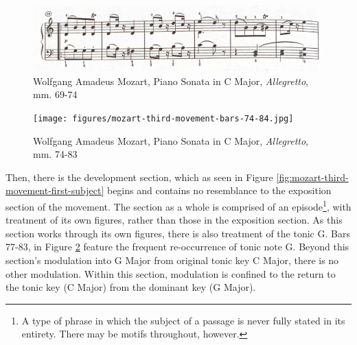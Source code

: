 \begin{figure}[h]
	\centering
	\includegraphics[width=\textwidth]{figures/mozart-third-movement-development-section-first-six-bars.jpg}
	\caption{Wolfgang Amadeus Mozart, Piano Sonata in C Major, \textit{Allegretto}, mm. 69-74}
	\label{fig:mozart-third-movement-development-section-first-six-bars}
\end{figure}

\begin{figure}
	\centering
	\texttt{[image: figures/mozart-third-movement-bars-74-84.jpg]}
	\caption{Wolfgang Amadeus Mozart, Piano Sonata in C Major, \textit{Allegretto}, mm. 74-83}
	\label{fig:mozart-third-movement-bars-74-84}
\end{figure}

Then, there is the development section, which as seen in Figure \ref{fig:mozart-third-movement-first-subject}\autocite{Henle_1977} begins and contains no resemblance to the exposition section of the movement. The section as a whole is comprised of an episode\footnote{A type of phrase in which the subject of a passage is never fully stated in its entirety. There may be motifs throughout, however.}, with treatment of its own figures, rather than those in the exposition section. As this section works through its own figures, there is also treatment of the tonic G. Bars 77-83, in Figure \ref{fig:mozart-third-movement-bars-74-84}\autocite{Henle_1977} feature the frequent re-occurrence of tonic note G. Beyond this section's modulation into G Major from original tonic key C Major, there is no other modulation. Within this section, modulation is confined to the return to the tonic key (C Major) from the dominant key (G Major).

